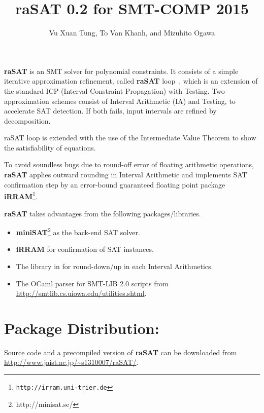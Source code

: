 \documentclass[runningheads,a4paper,oribibl]{llncs}
\begin{document}
%
\title{{\bf raSAT 0.2} for SMT-COMP 2015}

\author{Vu Xuan Tung, To Van Khanh, and Mizuhito Ogawa} 


\maketitle

{\bf raSAT} is an SMT solver for polynomial constraints. 
It consists of a simple iterative approximation refinement, called {\bf raSAT} loop~\cite{VanKhanh201227}, 
which is an extension of the standard ICP (Interval Constraint Propagation) with Testing. 
Two approximation schemes consist of Interval Arithmetic (IA) and 
Testing, to accelerate SAT detection. 
If both fails, input intervals are refined by decomposition.  

raSAT loop is extended with the use of the Intermediate Value Theorem to show the satisfiability of equations. 

To avoid soundless bugs due to round-off error of floating arithmetic operations, \textbf{raSAT} applies outward rounding in Interval Arithmetic and implements SAT confirmation step by an error-bound guaranteed floating point package {\bf iRRAM}\footnote{%
\tt http://irram.uni-trier.de}. 

\textbf{raSAT} takes advantages from the following packages/libraries.
\begin{itemize}
\item {\bf miniSAT}\footnote{http://minisat.se/} as the back-end SAT solver.
\item {\bf iRRAM} for confirmation of SAT instances.
\item The library in \cite{Al2012.14} for
round-down/up in each Interval Arithmetics.
\item The OCaml parser for SMT-LIB 2.0 scripts from \url{http://smtlib.cs.uiowa.edu/utilities.shtml}.
\end{itemize}

\section*{Package Distribution:} Source code and a precompiled version of \textbf{raSAT} can be downloaded from \url{http://www.jaist.ac.jp/~s1310007/raSAT/}.





\end{document}
